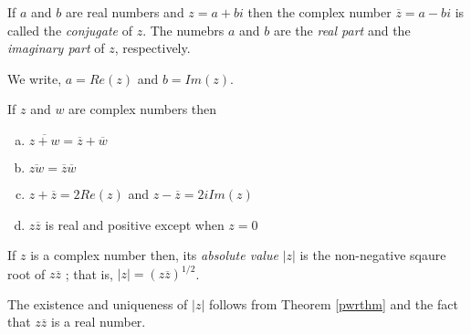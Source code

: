 \begin{defn}
    If $a$ and $b$ are real numbers and $z = a + bi$ then 
    the complex number $\overline{z} = a - bi$ is called the {\it conjugate} of $z$. 
    The numebrs $a$ and $b$ are the {\it real part} and the {\it imaginary part} of $z$, respectively.

    We write, $a = Re(z)$ and $b = Im(z)$.
\end{defn}

\begin{thm}
    If $z$ and $w$ are complex numbers then
    \begin{enumerate}[a)]
        \item $\overline{z+w} = \overline{z} + \overline{w}$
        \item $\overline{zw} = \overline{z} \overline{w}$
        \item $z + \overline{z} = 2Re(z)$ and $z - \overline{z} = 2 i Im(z)$
        \item $z\overline{z}$ is real and positive except when $z = 0$
    \end{enumerate}
\end{thm}

\begin{defn}
    If $z$ is a complex number then, its {\it absolute value} $|z|$ is the non-negative 
    sqaure root of $z\overline{z}$ ; that is, $|z| = (z\overline{z})^{1/2}$.
        
    The existence and uniqueness of $|z|$ follows from Theorem \ref{pwrthm} and the fact that $z \overline{z}$ is a real number.
\end{defn}

